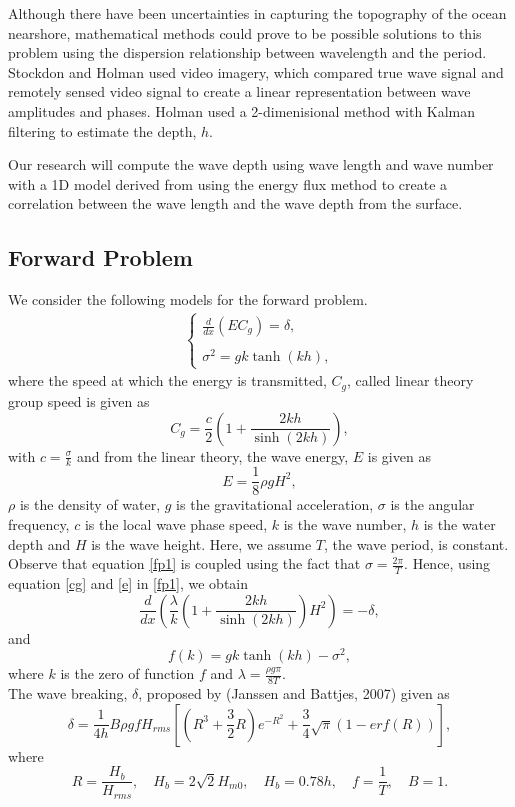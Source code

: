 Although there have been uncertainties in capturing the topography of the ocean nearshore, mathematical methods could prove to be possible solutions to this problem using the dispersion relationship between wavelength and the period. Stockdon and Holman used video imagery, which compared true wave signal and remotely sensed video signal to create a linear representation between wave amplitudes and phases. Holman used a 2-dimenisional method with Kalman filtering to estimate the depth, $h$.

Our research will compute the wave depth using wave length and wave number with a 1D model derived from using the energy flux method to create a correlation between the wave length and the wave depth from the surface.
\subsection{Forward Problem}
We consider the following models for the forward problem.
\begin{eqnarray}
\label{fp1}
\left \{
\begin{array}{lll}
\frac{d}{dx}\left(EC_g\right)=\delta,\\
\\
\sigma^2=gk\tanh(kh),
\label{ode}
\end{array}
\right.
\end{eqnarray}
where the speed at which the energy is transmitted, $C_g$, called linear theory group speed is given as
\begin{equation}
\label{cg}
C_g=\frac{c}{2}\left(1+\frac{2kh}{\sinh(2kh)}\right),
\end{equation}
with $c=\frac{\sigma}{k}$ and from the linear theory, the wave energy, $E$ is given as
\begin{equation}
\label{e}
E=\frac{1}{8}\rho g H^2,
\end{equation}
$\rho$ is the density of water, $g$ is the gravitational acceleration, $\sigma$ is the angular frequency, $c$ is the local wave phase speed, $k$ is the wave number, $h$ is the water depth and $H$ is the wave height. Here, we assume $T$, the wave period, is constant.\\ 


\noindent Observe that equation \ref{fp1} is coupled using the fact that $\sigma=\frac{2\pi}{T}$. Hence, using equation \ref{cg} and \ref{e} in \ref{fp1}, we obtain
\begin{equation}
\frac{d}{dx}\left( \frac{\lambda}{k}\left(1+\frac{2kh}{\sinh(2kh)}\right)H^2 \right)=-\delta,
\end{equation}  
and 
\begin{equation}
f(k) = gk\tanh(kh)-\sigma^2,
\end{equation}
where $k$ is the zero of function $f$ and $\lambda=\frac{\rho g \pi}{8T}$.\\
The wave breaking, $\delta$, proposed by (Janssen and Battjes, 2007) given as
\begin{equation}
\delta = \frac{1}{4h}B\rho g f H_{rms}\left[(R^3+\frac{3}{2}R)e^{-R^2}+\frac{3}{4}\sqrt{\pi}(1-erf(R))\right],
\end{equation}
where $$R=\frac{H_b}{H_{rms}}, \quad H_b = 2\sqrt{2}H_{m0},\quad H_b=0.78h,\quad f=\frac{1}{T},\quad B=1.$$